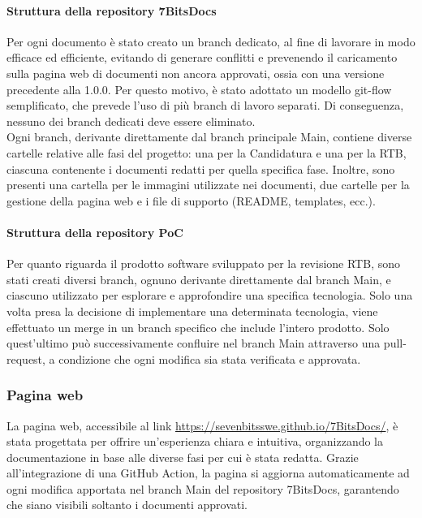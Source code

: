 \documentclass[10pt]{article}
\begin{document}
\begin{justify}
        \paragraph{Struttura della repository 7BitsDocs}
        Per ogni documento è stato creato un branch dedicato, al fine di lavorare in modo efficace ed efficiente, evitando di generare conflitti e prevenendo il caricamento sulla pagina web di documenti non ancora approvati, ossia con una versione precedente alla 1.0.0. Per questo motivo, è stato adottato un modello git-flow semplificato, che prevede l'uso di più branch di lavoro separati. Di conseguenza, nessuno dei branch dedicati deve essere eliminato.\\
        Ogni branch, derivante direttamente dal branch principale Main, contiene diverse cartelle relative alle fasi del progetto: una per la Candidatura e una per la RTB, ciascuna contenente i documenti redatti per quella specifica fase. Inoltre, sono presenti una cartella per le immagini utilizzate nei documenti, due cartelle per la gestione della pagina web e i file di supporto (README, templates, ecc.).

        \paragraph{Struttura della repository PoC}
        Per quanto riguarda il prodotto software sviluppato per la revisione RTB, sono stati creati diversi branch, ognuno derivante direttamente dal branch Main, e ciascuno utilizzato per esplorare e approfondire una specifica tecnologia. Solo una volta presa la decisione di implementare una determinata tecnologia, viene effettuato un merge in un branch specifico che include l'intero prodotto. Solo quest'ultimo può successivamente confluire nel branch Main attraverso una pull-request, a condizione che ogni modifica sia stata verificata e approvata.
    
    \subsubsection{Pagina web} 
    La pagina web, accessibile al link \href{https://sevenbitsswe.github.io/7BitsDocs/}{https://sevenbitsswe.github.io/7BitsDocs/}, è stata progettata per offrire un'esperienza chiara e intuitiva, organizzando la documentazione in base alle diverse fasi per cui è stata redatta. Grazie all'integrazione di una GitHub Action, la pagina si aggiorna automaticamente ad ogni modifica apportata nel branch Main del repository 7BitsDocs, garantendo che siano visibili soltanto i documenti approvati.


\end{justify}
\end{document}
